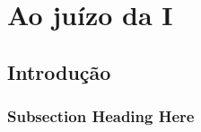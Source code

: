 \documentclass[
  12pt,
	oneside,
	a4paper,
	english,			%
	french,				%
	spanish,			%
  brazil
]{memoir}
\begin{document}
\chapter{Ao juízo da I}
\section{Introdução}
\lipsum[2-8]
\subsection{Subsection Heading Here}
\lipsum[1-2]
\end{document}
